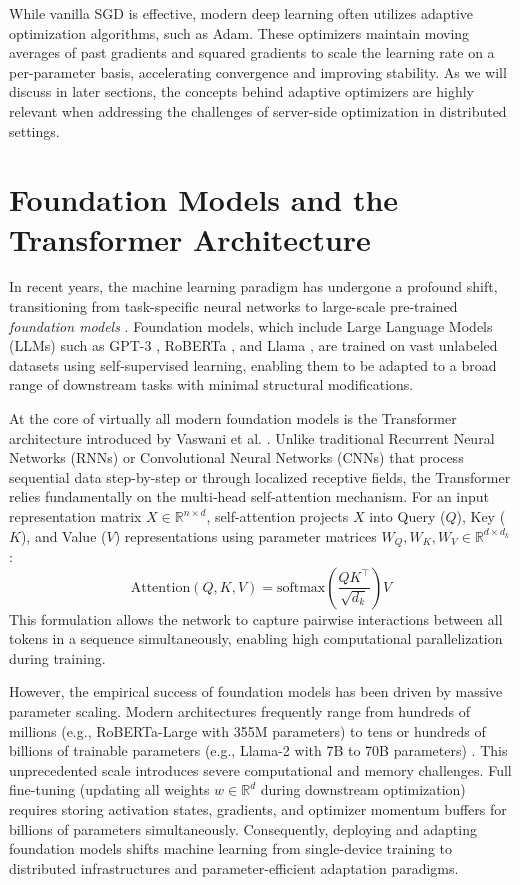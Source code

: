 While vanilla SGD is effective, modern deep learning often utilizes adaptive optimization algorithms, such as Adam. These optimizers maintain moving averages of past gradients and squared gradients to scale the learning rate on a per-parameter basis, accelerating convergence and improving stability. As we will discuss in later sections, the concepts behind adaptive optimizers are highly relevant when addressing the challenges of server-side optimization in distributed settings.

\section{Foundation Models and the Transformer Architecture}
\label{sec:foundation_models}

In recent years, the machine learning paradigm has undergone a profound shift, transitioning from task-specific neural networks to large-scale pre-trained \emph{foundation models} \cite{bommasani2021opportunities}. Foundation models, which include Large Language Models (LLMs) such as GPT-3 \cite{brown2020language}, RoBERTa \cite{liu2019roberta}, and Llama \cite{touvron2023llama}, are trained on vast unlabeled datasets using self-supervised learning, enabling them to be adapted to a broad range of downstream tasks with minimal structural modifications.

At the core of virtually all modern foundation models is the Transformer architecture introduced by Vaswani et al. \cite{vaswani2017attention}. Unlike traditional Recurrent Neural Networks (RNNs) or Convolutional Neural Networks (CNNs) that process sequential data step-by-step or through localized receptive fields, the Transformer relies fundamentally on the multi-head self-attention mechanism. For an input representation matrix $X \in \mathbb{R}^{n \times d}$, self-attention projects $X$ into Query ($Q$), Key ($K$), and Value ($V$) representations using parameter matrices $W_Q, W_K, W_V \in \mathbb{R}^{d \times d_k}$:
\begin{equation}
    \text{Attention}(Q, K, V) = \text{softmax}\left( \frac{Q K^\top}{\sqrt{d_k}} \right) V
    \label{eq:self_attention}
\end{equation}
This formulation allows the network to capture pairwise interactions between all tokens in a sequence simultaneously, enabling high computational parallelization during training.

However, the empirical success of foundation models has been driven by massive parameter scaling. Modern architectures frequently range from hundreds of millions (e.g., RoBERTa-Large with 355M parameters) to tens or hundreds of billions of trainable parameters (e.g., Llama-2 with 7B to 70B parameters) \cite{touvron2023llama}. This unprecedented scale introduces severe computational and memory challenges. Full fine-tuning (updating all weights $w \in \mathbb{R}^d$ during downstream optimization) requires storing activation states, gradients, and optimizer momentum buffers for billions of parameters simultaneously. Consequently, deploying and adapting foundation models shifts machine learning from single-device training to distributed infrastructures and parameter-efficient adaptation paradigms.

